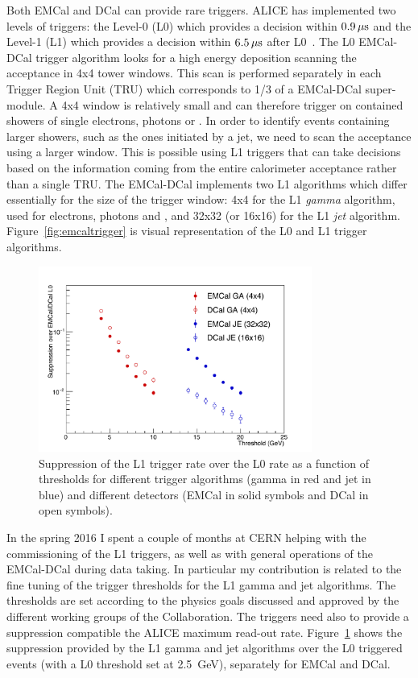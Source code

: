 \documentclass[12pt, a4paper, twoside, titlepage]{article}
\begin{document}
Both EMCal and DCal can provide rare triggers. ALICE has implemented two levels of triggers: the Level-0 (L0) which provides a decision within 
$0.9\,\rm \mu s$ and the Level-1 (L1) which provides a decision within $6.5\,\rm \mu s$ after L0~\cite{ALICE:2014b}. The L0 EMCal-DCal trigger algorithm looks for a high energy
deposition scanning the acceptance in 4x4 tower windows. This scan is performed separately in each Trigger Region Unit (TRU) which corresponds to 1/3 of a EMCal-DCal super-module.
A 4x4 window is relatively small and can therefore trigger on contained showers of single electrons, photons or \pizero.
In order to identify events containing larger showers, such as the ones initiated by a jet, we need to scan the acceptance using a larger window. This is possible using
L1 triggers that can take decisions based on the information coming from the entire calorimeter acceptance rather than a single TRU. The EMCal-DCal implements two L1 algorithms
which differ essentially for the size of the trigger window: 4x4 for the L1 \emph{gamma} algorithm, used for electrons, photons and \pizero, and 32x32 (or 16x16) for the L1 \emph{jet} algorithm.
Figure~\ref{fig:emcaltrigger} is visual representation of the L0 and L1 trigger algorithms.

\begin{figure}[tb]
\begin{center}
\includegraphics[width=0.8\textwidth]{img/EMCalTriggerSuppression}
 \caption{Suppression of the L1 trigger rate over the L0 rate as a function of thresholds for different trigger algorithms (gamma in red and jet in blue) and different detectors (EMCal in solid symbols and DCal in open symbols).} 
 \label{fig:EMCalTriggerSuppression}
\end{center}
\end{figure}

In the spring 2016 I spent a couple of months at CERN helping with the commissioning of the L1 triggers, as well as with general operations of the EMCal-DCal during data taking.
In particular my contribution is related to the fine tuning of the trigger thresholds for the L1 gamma and jet algorithms. The thresholds are set according to the physics goals discussed
and approved by the different working groups of the Collaboration. The triggers need also to provide a suppression compatible the ALICE maximum read-out rate.
Figure~\ref{fig:EMCalTriggerSuppression} shows the suppression provided by the L1 gamma and jet algorithms over the L0 triggered events (with a L0 threshold set at 2.5~GeV), separately for EMCal and DCal.

{}

\end{document}
